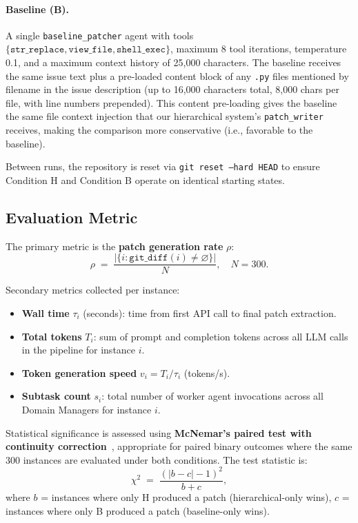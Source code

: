 \paragraph{Baseline (B).}
A single \texttt{baseline\_patcher} agent with tools
$\{\texttt{str\_replace}, \texttt{view\_file}, \texttt{shell\_exec}\}$,
maximum 8 tool iterations, temperature 0.1, and a maximum context history
of 25,000 characters. The baseline receives the same issue text plus a
pre-loaded content block of any \texttt{.py} files mentioned by filename in
the issue description (up to 16,000 characters total, 8,000 chars per file,
with line numbers prepended). This content pre-loading gives the baseline
the same file context injection that our hierarchical system's
\texttt{patch\_writer} receives, making the comparison more conservative
(i.e., favorable to the baseline).

Between runs, the repository is reset via \texttt{git reset --hard HEAD}
to ensure Condition H and Condition B operate on identical starting states.

\subsection{Evaluation Metric}
\label{sec:exp:metric}

The primary metric is the \textbf{patch generation rate} $\rho$:
\begin{equation}
  \rho \;=\; \frac{|\{i : \texttt{git\_diff}(i) \neq \varnothing\}|}{N},
  \quad N = 300.
\end{equation}

Secondary metrics collected per instance:
\begin{itemize}
  \item \textbf{Wall time} $\tau_i$ (seconds): time from first API call to
    final patch extraction.
  \item \textbf{Total tokens} $T_i$: sum of prompt and completion tokens
    across all LLM calls in the pipeline for instance $i$.
  \item \textbf{Token generation speed} $v_i = T_i / \tau_i$ (tokens/s).
  \item \textbf{Subtask count} $s_i$: total number of worker agent
    invocations across all Domain Managers for instance $i$.
\end{itemize}

\noindent Statistical significance is assessed using \textbf{McNemar's
paired test with continuity correction}~\cite{mcnemar1947}, appropriate for
paired binary outcomes where the same 300 instances are evaluated under
both conditions. The test statistic is:
\begin{equation}
  \chi^2 \;=\; \frac{(|b - c| - 1)^2}{b + c},
\end{equation}
where $b$ = instances where only H produced a patch (hierarchical-only
wins), $c$ = instances where only B produced a patch (baseline-only wins).

